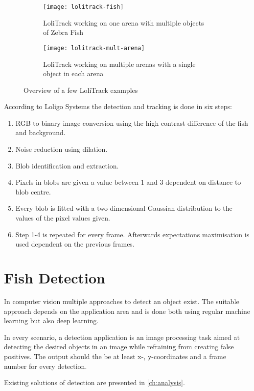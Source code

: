 \begin{figure}[H]
	\centering
	\begin{subfigure}{0.45\textwidth}
		\texttt{[image: lolitrack-fish]}
		\caption{LoliTrack working on one arena with multiple objects of Zebra Fish}
	\end{subfigure}
	\begin{subfigure}{0.45\textwidth}
		\texttt{[image: lolitrack-mult-arena]}
		\caption{LoliTrack working on multiple arenas with a single object in each arena}
	\end{subfigure}
	\caption{Overview of a few LoliTrack examples}
	\label{fig:lolitrack_examples}
\end{figure}

According to Loligo Systems the detection and tracking is done in six steps:

\begin{enumerate}
	\item RGB to binary image conversion using the high contrast difference of the fish and background.
	\item Noise reduction using dilation.
	\item Blob identification and extraction.
	\item Pixels in blobs are given a value between $1$ and $3$ dependent on distance to blob centre.
	\item Every blob is fitted with a two-dimensional Gaussian distribution to the values of the pixel values given.
	\item Step 1-4 is repeated for every frame. Afterwards expectations maximisation is used dependent on the previous frames.
\end{enumerate}

\section{Fish Detection}
In computer vision multiple approaches to detect an object exist. The suitable approach depends on the application area and is done both using regular machine learning but also deep learning.

In every scenario, a detection application is an image processing task aimed at detecting the desired objects in an image while refraining from creating false positives. The output should the be at least x-, y-coordinates and a frame number for every detection.

Existing solutions of detection are presented in \autoref{ch:analysis}.

